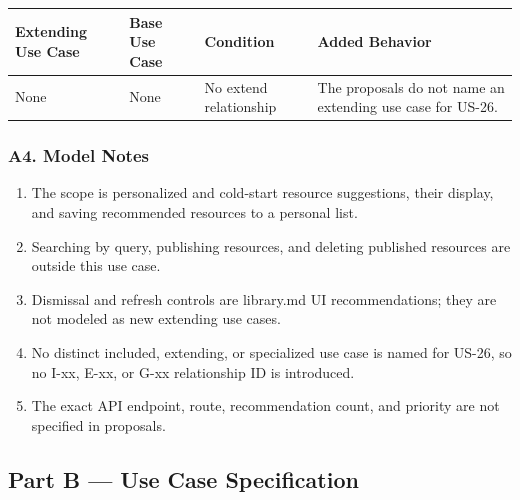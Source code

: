 \documentclass[12pt]{article}
\renewcommand{\baselinestretch}{1.5}
\begin{document}
\begingroup
\small
\renewcommand{\baselinestretch}{1.0}\selectfont
\renewcommand{\arraystretch}{1.15}
\setlength{\tabcolsep}{6pt}
\begin{longtable}{|>{\raggedright\arraybackslash}p{}|>{\raggedright\arraybackslash}p{}|>{\raggedright\arraybackslash}p{}|>{\raggedright\arraybackslash}p{}|}
\hline
\textbf{Extending Use Case} & \textbf{Base Use Case} & \textbf{Condition} & \textbf{Added Behavior} \\ \hline
\endhead
None & None & No extend relationship & The proposals do not name an extending use case for US-26. \\ \hline
\end{longtable}
\endgroup
\par\medskip

\hypertarget{sec:a4-model-notes}{}
\subsubsection*{A4. Model Notes}
\par\medskip

\begin{enumerate}
\item The scope is personalized and cold-start resource suggestions, their display, and saving recommended resources to a personal list.
\item Searching by query, publishing resources, and deleting published resources are outside this use case.
\item Dismissal and refresh controls are library.md UI recommendations; they are not modeled as new extending use cases.
\item No distinct included, extending, or specialized use case is named for US-26, so no I-xx, E-xx, or G-xx relationship ID is introduced.
\item The exact API endpoint, route, recommendation count, and priority are not specified in proposals.
\end{enumerate}
\par\medskip

\hypertarget{sec:part-b-use-case-specification}{}
\subsection*{Part B --- Use Case Specification}
\par\medskip
\end{document}
